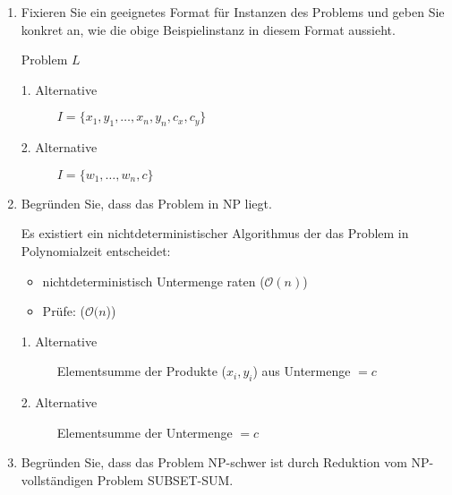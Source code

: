 \documentclass{bschlangaul-aufgabe}
\begin{document}
\begin{enumerate}


\item Fixieren Sie ein geeignetes Format für Instanzen des Problems und
geben Sie konkret an, wie die obige Beispielinstanz in diesem Format
aussieht.

\begin{bAntwort}
Problem $L$
\begin{description}
\item[1. Alternative]
$I = \{ x_1, y_1, \dots, x_n, y_n, c_x, c_y \}$

\item[2. Alternative]
$I = \{ w_1, \dots, w_n, c \}$
\end{description}
\end{bAntwort}


\item Begründen Sie, dass das Problem in NP liegt.

\begin{bAntwort}
Es existiert ein nichtdeterministischer Algorithmus der das Problem in
Polynomialzeit entscheidet:

\begin{itemize}
\item nichtdeterministisch Untermenge raten ($\mathcal{O}(n)$)
\item Prüfe: ($\mathcal{O}(n$))
\end{itemize}

\begin{description}
\item[1. Alternative]

Elementsumme der Produkte ($x_i, y_i$) aus Untermenge $= c$

\item[2. Alternative]

Elementsumme der Untermenge $= c$
\end{description}
\end{bAntwort}


\item Begründen Sie, dass das Problem NP-schwer ist durch Reduktion vom
NP-vollständigen Problem SUBSET-SUM.

\begin{bAntwort}

\begin{description}


\end{description}
\end{bAntwort}
\end{enumerate}
\end{document}
